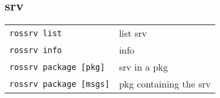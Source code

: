 \documentclass[10pt,landscape,a4paper]{article}
\begin{document}
\begin{multicols}{3}
        
            \subsection{srv}
                \begin{tabular}{@{}ll@{}}
                    \verb!rossrv list!    & list srv \\
                    \verb!rossrv info!    & info \\
                    \verb!rossrv package [pkg]!    & srv in a pkg \\
                    \verb!rossrv package [msgs]!    & pkg containing the srv \\
                \end{tabular} \\
                
        
    
    
        
    \end{multicols}
    
    
    \newpage
    
    
    


    
\end{document}
